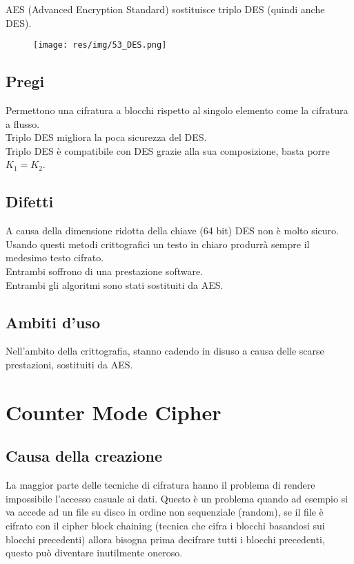 AES (Advanced Encryption Standard) sostituisce triplo DES (quindi anche DES).

\begin{figure}[H]
\centering
\texttt{[image: res/img/53\_DES.png]}
\end{figure}

\subsection{Pregi}
Permettono una cifratura a blocchi rispetto al singolo elemento come la cifratura a flusso.\\
Triplo DES migliora la poca sicurezza del DES.\\
Triplo DES è compatibile con DES grazie alla sua composizione, basta porre $K_1=K_2$.

\subsection{Difetti}
A causa della dimensione ridotta della chiave (64 bit) DES non è molto sicuro.\\
Usando questi metodi crittografici un testo in chiaro produrrà sempre il medesimo testo cifrato.\\
Entrambi soffrono di una prestazione software.\\
Entrambi gli algoritmi sono stati sostituiti da AES.

\subsection{Ambiti d'uso}
Nell'ambito della crittografia, stanno cadendo in disuso a causa delle scarse prestazioni, sostituiti da AES.

\section{Counter Mode Cipher}
\subsection{Causa della creazione}
La maggior parte delle tecniche di cifratura hanno il problema di rendere impossibile l'accesso casuale ai dati. Questo è un problema quando ad esempio si va accede ad un file su disco in ordine non sequenziale (random), se il file è cifrato con il cipher block chaining (tecnica che cifra i blocchi basandosi sui blocchi precedenti) allora bisogna prima decifrare tutti i blocchi precedenti, questo può diventare inutilmente oneroso.
